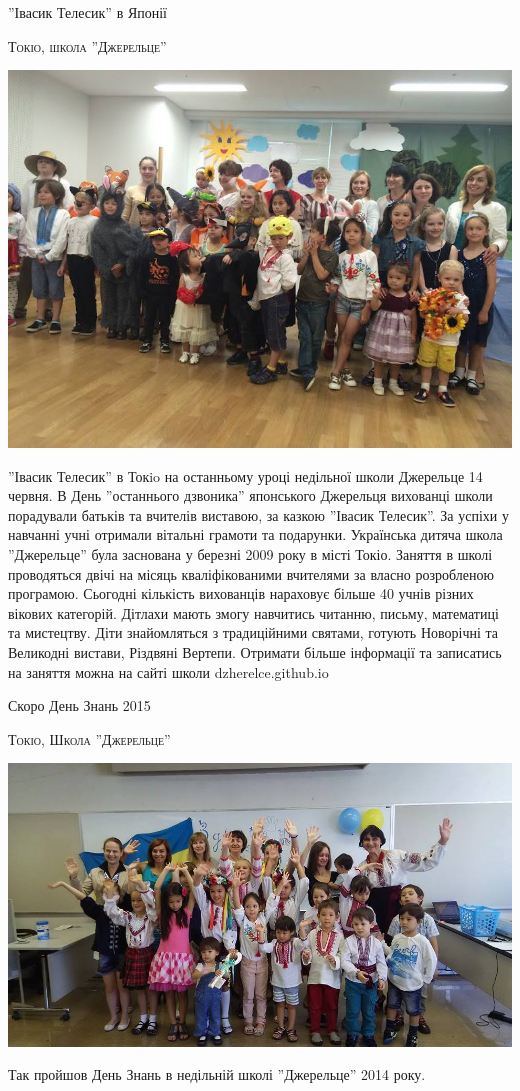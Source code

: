 \documentclass[10pt,a4paper]{article}
\newcommand{\NewsItem}[1]{%
		\usefont{T2A}{iwona}{m}{n} 
		\large #1 \vspace{4pt}
		\par \normalsize \normalfont}
\newcommand{\NewsAuthor}[1]{%
			\hfill \textsc{#1} \vspace{4pt}
			\par \normalfont}
\begin{document}
\begin{multicols}{3}
\vspace{1cm}
\NewsItem{''Івасик Телесик'' в Японії}
\NewsAuthor{Токіо, школа ''Джерельце''}
		\begin{center}
			\includegraphics[width=0.8\linewidth]{images/telesyk}
		\end{center}
''Івасик Телесик'' в Токio на останньому уроці недільної школи Джерельце 14 червня. В День ''останнього дзвоника'' японського Джерельця вихованці школи порадували батьків та вчителів виставою, за казкою ''Івасик Телесик''. За успіхи у навчанні учні отримали вітальні грамоти та подарунки. Українська дитяча школа ''Джерельце'' була заснована у березні 2009 року в місті Токіо. Заняття в школі проводяться двічі на місяць кваліфікованими вчителями за власно розробленою програмою. Сьогодні кількість вихованців нараховує більше 40 учнів різних вікових категорій. Дітлахи мають змогу навчитись читанню, письму, математиці та мистецтву. Діти знайомляться з традиційними святами, готують Новорічні та Великодні вистави, Різдвяні Вертепи. Отримати більше інформації та записатись на заняття можна на сайті школи dzherelce.github.io

\vspace{1cm}
\NewsItem{Скоро День Знань 2015}
\NewsAuthor{Токіо, Школа ''Джерельце''}
		\begin{center}
			\includegraphics[width=0.8\linewidth]{images/den-znan}
		\end{center}
Так пройшов День Знань в недільній школі ''Джерельце'' 2014 року.

\end{multicols}
\end{document}
